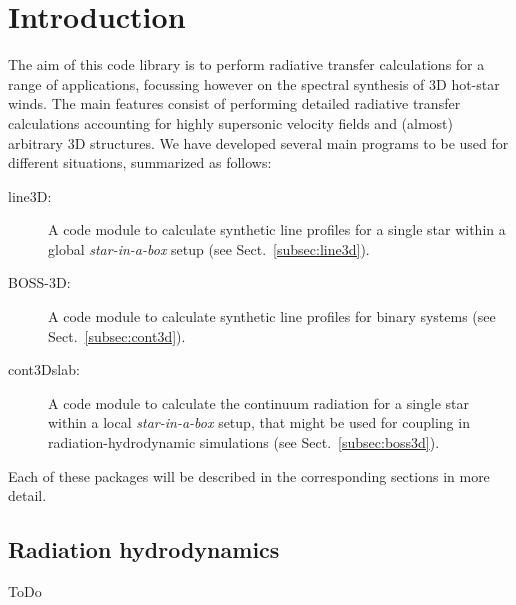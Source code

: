 \documentclass[10pt,a4paper]{article}
\title{\notesTitle}
\author{\notesAuthor}
\begin{document}
\maketitle
%
\clearpage
\tableofcontents
\clearpage
%
\section{Introduction}
The aim of this code library is to perform radiative transfer
calculations for a range of applications, focussing however
on the spectral synthesis of 3D hot-star winds. The main
features consist of performing detailed radiative transfer
calculations accounting for highly supersonic velocity fields and
(almost) arbitrary 3D structures. We have developed several main
programs to be used for different situations, summarized as follows:
%
\begin{description}
  \item[line3D:] A code module to calculate synthetic line profiles for a single star within a global \textit{star-in-a-box} setup (see Sect.~\ref{subsec:line3d}).
  \item[BOSS-3D:] A code module to calculate synthetic line profiles for binary systems (see Sect.~\ref{subsec:cont3d}).  
  \item[cont3Dslab:] A code module to calculate the continuum radiation for a single star within a local \textit{star-in-a-box} setup, that might be used for coupling in radiation-hydrodynamic simulations (see Sect.~\ref{subsec:boss3d}).
\end{description}
%
Each of these packages will be described in the corresponding sections in more detail.

\subsection{Radiation hydrodynamics}
ToDo
\end{document}
